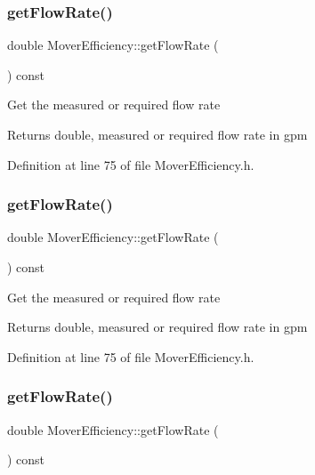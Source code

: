 \subsubsection{\texorpdfstring{get\+Flow\+Rate()}{getFlowRate()}\hspace{0.1cm}{\footnotesize\ttfamily [1/3]}}
{\footnotesize\ttfamily double Mover\+Efficiency\+::get\+Flow\+Rate (\begin{DoxyParamCaption}{ }\end{DoxyParamCaption}) const\hspace{0.3cm}{\ttfamily [inline]}}

Get the measured or required flow rate \begin{DoxyReturn}{Returns}
double, measured or required flow rate in gpm 
\end{DoxyReturn}


Definition at line 75 of file Mover\+Efficiency.\+h.

\mbox{\label{class_mover_efficiency_a3b0d468a68703127624ab996f03d2368}} 
\subsubsection{\texorpdfstring{get\+Flow\+Rate()}{getFlowRate()}\hspace{0.1cm}{\footnotesize\ttfamily [2/3]}}
{\footnotesize\ttfamily double Mover\+Efficiency\+::get\+Flow\+Rate (\begin{DoxyParamCaption}{ }\end{DoxyParamCaption}) const\hspace{0.3cm}{\ttfamily [inline]}}

Get the measured or required flow rate \begin{DoxyReturn}{Returns}
double, measured or required flow rate in gpm 
\end{DoxyReturn}


Definition at line 75 of file Mover\+Efficiency.\+h.

\mbox{\label{class_mover_efficiency_a3b0d468a68703127624ab996f03d2368}} 
\subsubsection{\texorpdfstring{get\+Flow\+Rate()}{getFlowRate()}\hspace{0.1cm}{\footnotesize\ttfamily [3/3]}}
{\footnotesize\ttfamily double Mover\+Efficiency\+::get\+Flow\+Rate (\begin{DoxyParamCaption}{ }\end{DoxyParamCaption}) const\hspace{0.3cm}{\ttfamily [inline]}}

